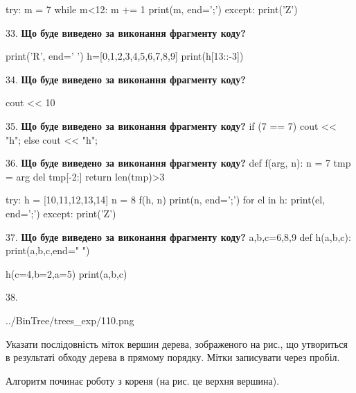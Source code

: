 \documentclass[11pt]{article}
\begin{document}
try:
    m = 7
    while m<12:
        m += 1
    print(m, end=';')
except:
    print('Z')

\par\vspace{5mm}

33. \textbf{Що буде виведено за виконання фрагменту коду?}

print('R', end=' ')
h=[0,1,2,3,4,5,6,7,8,9]
print(h[13::-3])

\par\vspace{5mm}

34. \textbf{Що буде виведено за виконання фрагменту коду?}

cout << 10 %
\par\vspace{5mm}

35. \textbf{Що буде виведено за виконання фрагменту коду?}
if (7 == 7)
    cout << "h";
else
    cout << "h";

\par\vspace{5mm}

36. \textbf{Що буде виведено за виконання фрагменту коду?}
def f(arg, n):
    n = 7
    tmp = arg
    del tmp[-2:]
    return len(tmp)>3

try:
    h = [10,11,12,13,14]
    n = 8
    f(h, n)
    print(n, end=';')
    for el in h:
        print(el, end=';')
except:
    print('Z')
\par\vspace{5mm}

37. \textbf{Що буде виведено за виконання фрагменту коду?}
a,b,c=6,8,9
def h(a,b,c):
    print(a,b,c,end=" ")

h(c=4,b=2,a=5)
print(a,b,c)
\par\vspace{5mm}

38. 

\begin{center}
	{../BinTree/trees_exp/110.png}
\end{center}
Указати послідовність міток вершин дерева, зображеного на рис., що утвориться в результаті обходу дерева в прямому порядку. Мітки записувати через пробіл.\par Алгоритм починає роботу з кореня (на рис. це верхня вершина).
\par\vspace{5mm}
\end{document}
